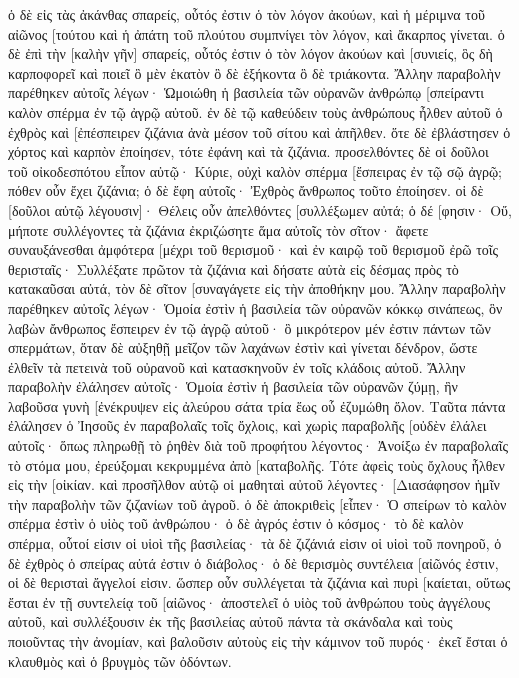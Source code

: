 ὁ δὲ εἰς τὰς ἀκάνθας σπαρείς, οὗτός ἐστιν ὁ τὸν λόγον ἀκούων, καὶ ἡ μέριμνα τοῦ αἰῶνος [τούτου καὶ ἡ ἀπάτη τοῦ πλούτου συμπνίγει τὸν λόγον, καὶ ἄκαρπος γίνεται. 
ὁ δὲ ἐπὶ τὴν [καλὴν γῆν] σπαρείς, οὗτός ἐστιν ὁ τὸν λόγον ἀκούων καὶ [συνιείς, ὃς δὴ καρποφορεῖ καὶ ποιεῖ ὃ μὲν ἑκατὸν ὃ δὲ ἑξήκοντα ὃ δὲ τριάκοντα. 
Ἄλλην παραβολὴν παρέθηκεν αὐτοῖς λέγων· Ὡμοιώθη ἡ βασιλεία τῶν οὐρανῶν ἀνθρώπῳ [σπείραντι καλὸν σπέρμα ἐν τῷ ἀγρῷ αὐτοῦ. 
ἐν δὲ τῷ καθεύδειν τοὺς ἀνθρώπους ἦλθεν αὐτοῦ ὁ ἐχθρὸς καὶ [ἐπέσπειρεν ζιζάνια ἀνὰ μέσον τοῦ σίτου καὶ ἀπῆλθεν. 
ὅτε δὲ ἐβλάστησεν ὁ χόρτος καὶ καρπὸν ἐποίησεν, τότε ἐφάνη καὶ τὰ ζιζάνια. 
προσελθόντες δὲ οἱ δοῦλοι τοῦ οἰκοδεσπότου εἶπον αὐτῷ· Κύριε, οὐχὶ καλὸν σπέρμα [ἔσπειρας ἐν τῷ σῷ ἀγρῷ; πόθεν οὖν ἔχει ζιζάνια; 
ὁ δὲ ἔφη αὐτοῖς· Ἐχθρὸς ἄνθρωπος τοῦτο ἐποίησεν. οἱ δὲ [δοῦλοι αὐτῷ λέγουσιν]· Θέλεις οὖν ἀπελθόντες [συλλέξωμεν αὐτά; 
ὁ δέ [φησιν· Οὔ, μήποτε συλλέγοντες τὰ ζιζάνια ἐκριζώσητε ἅμα αὐτοῖς τὸν σῖτον· 
ἄφετε συναυξάνεσθαι ἀμφότερα [μέχρι τοῦ θερισμοῦ· καὶ ἐν καιρῷ τοῦ θερισμοῦ ἐρῶ τοῖς θερισταῖς· Συλλέξατε πρῶτον τὰ ζιζάνια καὶ δήσατε αὐτὰ εἰς δέσμας πρὸς τὸ κατακαῦσαι αὐτά, τὸν δὲ σῖτον [συναγάγετε εἰς τὴν ἀποθήκην μου. 
Ἄλλην παραβολὴν παρέθηκεν αὐτοῖς λέγων· Ὁμοία ἐστὶν ἡ βασιλεία τῶν οὐρανῶν κόκκῳ σινάπεως, ὃν λαβὼν ἄνθρωπος ἔσπειρεν ἐν τῷ ἀγρῷ αὐτοῦ· 
ὃ μικρότερον μέν ἐστιν πάντων τῶν σπερμάτων, ὅταν δὲ αὐξηθῇ μεῖζον τῶν λαχάνων ἐστὶν καὶ γίνεται δένδρον, ὥστε ἐλθεῖν τὰ πετεινὰ τοῦ οὐρανοῦ καὶ κατασκηνοῦν ἐν τοῖς κλάδοις αὐτοῦ. 
Ἄλλην παραβολὴν ἐλάλησεν αὐτοῖς· Ὁμοία ἐστὶν ἡ βασιλεία τῶν οὐρανῶν ζύμῃ, ἣν λαβοῦσα γυνὴ [ἐνέκρυψεν εἰς ἀλεύρου σάτα τρία ἕως οὗ ἐζυμώθη ὅλον. 
Ταῦτα πάντα ἐλάλησεν ὁ Ἰησοῦς ἐν παραβολαῖς τοῖς ὄχλοις, καὶ χωρὶς παραβολῆς [οὐδὲν ἐλάλει αὐτοῖς· 
ὅπως πληρωθῇ τὸ ῥηθὲν διὰ τοῦ προφήτου λέγοντος· Ἀνοίξω ἐν παραβολαῖς τὸ στόμα μου, ἐρεύξομαι κεκρυμμένα ἀπὸ [καταβολῆς. 
Τότε ἀφεὶς τοὺς ὄχλους ἦλθεν εἰς τὴν [οἰκίαν. καὶ προσῆλθον αὐτῷ οἱ μαθηταὶ αὐτοῦ λέγοντες· [Διασάφησον ἡμῖν τὴν παραβολὴν τῶν ζιζανίων τοῦ ἀγροῦ. 
ὁ δὲ ἀποκριθεὶς [εἶπεν· Ὁ σπείρων τὸ καλὸν σπέρμα ἐστὶν ὁ υἱὸς τοῦ ἀνθρώπου· 
ὁ δὲ ἀγρός ἐστιν ὁ κόσμος· τὸ δὲ καλὸν σπέρμα, οὗτοί εἰσιν οἱ υἱοὶ τῆς βασιλείας· τὰ δὲ ζιζάνιά εἰσιν οἱ υἱοὶ τοῦ πονηροῦ, 
ὁ δὲ ἐχθρὸς ὁ σπείρας αὐτά ἐστιν ὁ διάβολος· ὁ δὲ θερισμὸς συντέλεια [αἰῶνός ἐστιν, οἱ δὲ θερισταὶ ἄγγελοί εἰσιν. 
ὥσπερ οὖν συλλέγεται τὰ ζιζάνια καὶ πυρὶ [καίεται, οὕτως ἔσται ἐν τῇ συντελείᾳ τοῦ [αἰῶνος· 
ἀποστελεῖ ὁ υἱὸς τοῦ ἀνθρώπου τοὺς ἀγγέλους αὐτοῦ, καὶ συλλέξουσιν ἐκ τῆς βασιλείας αὐτοῦ πάντα τὰ σκάνδαλα καὶ τοὺς ποιοῦντας τὴν ἀνομίαν, 
καὶ βαλοῦσιν αὐτοὺς εἰς τὴν κάμινον τοῦ πυρός· ἐκεῖ ἔσται ὁ κλαυθμὸς καὶ ὁ βρυγμὸς τῶν ὀδόντων. 
